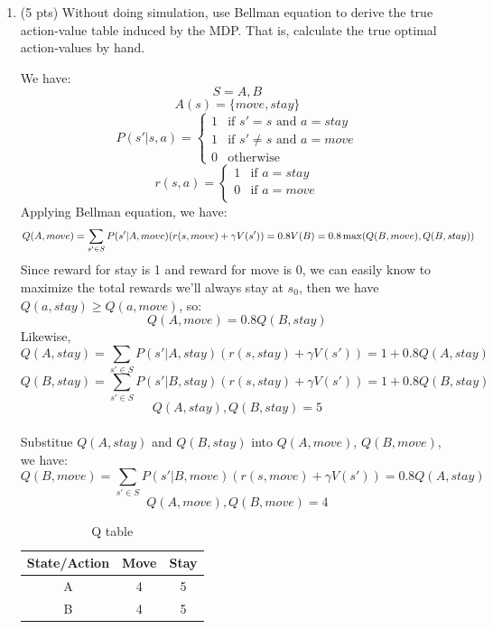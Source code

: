 \documentclass[a4paper]{article}
\theoremstyle{definition}
\newenvironment{soln}{
    \leavevmode\color{blue}\ignorespaces
}{}
\begin{document}
\begin{enumerate}
	      \pagebreak
	\item (5 pts) Without doing simulation, use Bellman equation to derive the true action-value table induced by the MDP. That is, calculate the true optimal action-values by hand.

	      \begin{soln}
		      We have:
		      \[S = {A,B}\]
		      \[A(s) = \{move, stay\}\]
		      \[P(s' | s, a) = \begin{cases}
				      1 & \text{if } s' = s \text{ and } a = stay    \\
				      1 & \text{if } s' \neq s \text{ and } a = move \\
				      0 & \text{otherwise}
			      \end{cases}\]
		      \[r(s, a) = \begin{cases}
				      1 & \text{if } a = stay \\
				      0 & \text{if } a = move \\
			      \end{cases}\]
		      Applying Bellman equation, we have:
		      \[
			      Q(A, move) = \sum_{s' \in S} P(s' | A, move) (r(s, move) + \gamma V(s')) = 0.8 V(B)\\
			      = 0.8 \max(Q(B, move), Q(B, stay))
		      \]
		      Since reward for stay is 1 and reward for move is 0, we can easily know to maximize the total rewards we'll always stay at $s_0$, then we have $Q(a, stay) \geq Q(a, move)$, so:
		      \[
			      Q(A, move) = 0.8 Q(B, stay)
		      \]
		      Likewise,
		      \[
			      Q(A, stay) = \sum_{s' \in S} P(s' | A, stay) (r(s, stay) + \gamma V(s')) = 1 + 0.8 Q(A, stay)
		      \]
		      \[
			      Q(B, stay) = \sum_{s' \in S} P(s' | B, stay) (r(s, stay) + \gamma V(s')) = 1 + 0.8 Q(B, stay)
		      \]
		      \[ Q(A, stay), Q(B, stay) = 5 \]\\

		      Substitue $Q(A, stay)$ and $Q(B, stay)$ into $Q(A, move)$, $Q(B, move)$, we have:
		      \[
			      Q(B, move) = \sum_{s' \in S} P(s' | B, move) (r(s, move) + \gamma V(s')) = 0.8 Q(A, stay)
		      \]
		      \[ Q(A, move), Q(B, move) =  4 \]


		      \begin{table}[!h]
			      \begin{center}
				      \begin{tabular}{ccc}
					      State/Action & Move & Stay \\\hline
					      A            & 4    & 5    \\
					      B            & 4    & 5
				      \end{tabular}
				      \caption*{Q table}
			      \end{center}
		      \end{table}


\end{soln}
\end{enumerate}
\end{document}
